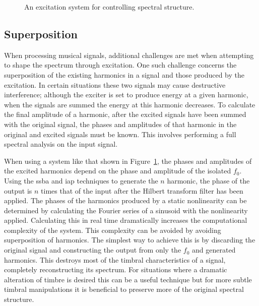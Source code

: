 \begin{figure}[h!]
			\caption{An excitation system for controlling spectral structure.}
			\label{fig:SpectralShapingSystem}
		\end{figure}

	\subsection{Superposition}
	\label{sec:FeatureControl-Systems-Superposition}
		When processing musical signals, additional challenges are met when attempting to shape the spectrum
		through excitation. One such challenge concerns the superposition of the existing harmonics in a signal and
		those produced by the excitation. In certain situations these two signals may cause destructive
		interference; although the exciter is set to produce energy at a given harmonic, when the signals are
		summed the energy at this harmonic decreases. To calculate the final amplitude of a harmonic, after the
		excited signals have been summed with the original signal, the phases and amplitudes of that harmonic in
		the original and excited signals must be known. This involves performing a full spectral analysis on the
		input signal. 

		When using a system like that shown in Figure~\ref{fig:SpectralShapingSystem}, the phases and amplitudes of
		the excited harmonics depend on the phase and amplitude of the isolated $f_{0}$. Using the \acrshort{ssba}
		and \acrshort{iap} techniques to generate the $n$ harmonic, the phase of the output is $n$ times
		that of the input after the Hilbert transform filter has been applied. The phases of the harmonics produced
		by a static nonlinearity can be determined by calculating the Fourier series of a sinusoid with the
		nonlinearity applied. Calculating this in real time dramatically increases the computational complexity of
		the system.  This complexity can be avoided by avoiding superposition of harmonics. The simplest way to
		achieve this is by discarding the original signal and constructing the output from only the $f_{0}$ and
		generated harmonics.  This destroys most of the timbral characteristics of a signal, completely
		reconstructing its spectrum. For situations where a dramatic alteration of timbre is desired this can be a
		useful technique but for more subtle timbral manipulations it is beneficial to preserve more of the
		original spectral structure.

